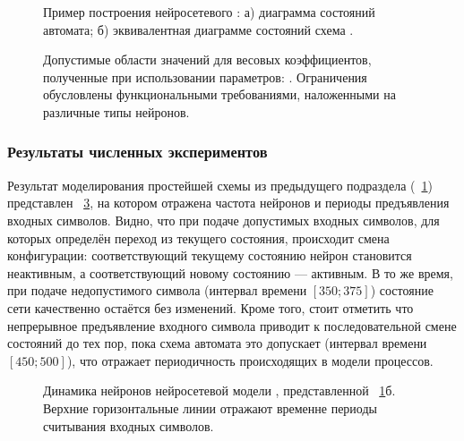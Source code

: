 \begin{figure}[ht]
    \caption{Пример построения нейросетевого : а) диаграмма состояний автомата; б) эквивалентная диаграмме состояний схема .} 
    \label{img:fsm_example_topology}  
\end{figure}

\begin{figure}[ht]
    \caption{Допустимые области значений для весовых коэффициентов, полученные при использовании параметров: . Ограничения обусловлены функциональными требованиями, наложенными на различные типы нейронов. } 
    \label{img:fsm_example_weights}  
\end{figure}


\subsubsection{Результаты численных экспериментов}

Результат моделирования простейшей схемы  из предыдущего подраздела (\seefigure~\ref{img:fsm_example_topology}) представлен \onfigure~\ref{img:fsm_example_dynamic}, на котором отражена частота нейронов  и периоды предъявления входных символов. Видно, что при подаче допустимых входных символов, \ie для которых определён переход из текущего состояния, происходит смена конфигурации: соответствующий текущему состоянию нейрон становится неактивным, а соответствующий новому состоянию --- активным. В то же время, при подаче недопустимого символа (интервал времени $[350; 375]$) состояние сети качественно остаётся без изменений. Кроме того, стоит отметить что непрерывное предъявление входного символа приводит к последовательной смене состояний до тех пор, пока схема автомата это допускает (интервал времени $[450; 500]$), что отражает периодичность происходящих в модели процессов.

\begin{figure}[ht]
    \caption{Динамика нейронов  нейросетевой модели , представленной \onfigure~\ref{img:fsm_example_topology}б. Верхние горизонтальные линии отражают временне периоды считывания входных символов.} 
    \label{img:fsm_example_dynamic}  
\end{figure}

